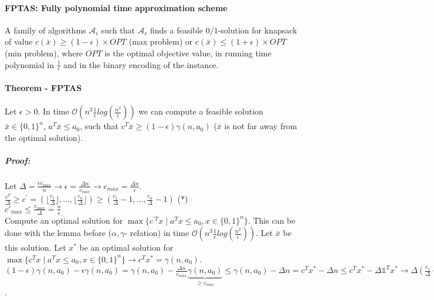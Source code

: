 \documentclass[main]{subfiles}
\begin{document}
\paragraph{FPTAS: Fully polynomial time approximation scheme} A family of
algorithms $\mathcal{A}_\epsilon$ such that $\mathcal{A}_\epsilon$ finds a
feasible $0/1$-solution for knapsack of value $c(\bar{x}) \geq (1-\epsilon)
\times OPT$ (max problem) or $c(\bar{x}) \leq (1+\epsilon) \times OPT$ (min
problem), where $OPT$ is the optimal objective value, in running time
polynomial in $\frac{1}{\epsilon}$ and in the binary encoding of the instance.

\paragraph{Theorem - FPTAS} Let $\epsilon > 0$. In time $\mathcal{O}(n^3
\frac{1}{\epsilon} log (\frac{n^2}{\epsilon}))$ we can compute a feasible
solution $\bar{x} \in \{0,1\}^n$, $a^T \bar{x} \leq a_0$, such that $c^T
\bar{x} \geq (1-\epsilon) \gamma (n, a_0)$ ($\bar{x}$ is not far away from the
optimal solution).

\subparagraph{Proof:}
Let $\Delta = \frac{\epsilon c_{max}}{n} \rightarrow \epsilon = \frac{\Delta n}
{c_{max}} \rightarrow c_{max} = \frac{\Delta n}{\epsilon}$.\\
$\frac{c^T}{\Delta} \geq c^\prime = (\lfloor \frac{c_1}{\Delta} \rfloor, \dots,
\lfloor \frac{c_n}{\Delta} \rfloor) \geq (\frac{c_1}{\Delta} - 1, \dots,
\frac{c_n}{\Delta} - 1)$ (*)\\
$c'_{max} \leq \frac{c_{max}}{\Delta} = \frac{n}{\epsilon}$\\
Compute an optimal solution for $\max \{c^{\prime T} x \mid a^T x \leq a_0,
x \in \{0,1\}^n \}$. This can be done with the lemma before ($\alpha, \gamma$-
relation) in time $\mathcal{O}(n^3 \frac{1}{\epsilon} log(\frac{n^2}
{\epsilon}))$. Let $\bar{x}$ be this solution. Let $x^*$ be an optimal solution 
for $\max \{c^T x \mid a^T x \leq a_0, x \in \{0,1\}^n\} \rightarrow c^T x^* =
\gamma (n, a_0)$.\\
$(1-\epsilon) \gamma (n,a_0) - \epsilon \gamma (n, a_0) = \gamma (n,a_0) -
\frac{\Delta n}{c_{max}} \underbrace{\gamma (n, a_0)}_{\geq c_{max}} \leq 
\gamma (n, a_0) - \Delta n = c^T x^* - \Delta n \leq c^T x^* - \Delta
\mathds{1}^T x^* \rightarrow \Delta (\frac{c_1}{\Delta} - 1, \dots, \frac{c_n}
{\Delta}-1) x^* \underbrace{\leq}_{\text{(*)}} \Delta c^{\prime T} x^* \leq 
\Delta c^{T} \bar{x} \leq c^T x$.
\end{document}
